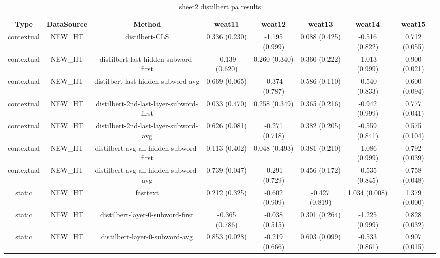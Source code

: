 \begin{sidewaystable}[htb]
    \centering
    \caption{sheet2 distilbert pa results}
    \label{appendix_tab:sheet2_distilbert_pa_results}
    \small
    \begin{tabular}{@{}cccccccc@{}}
        \toprule
        Type & DataSource & Method & weat11 & weat12 & weat13 & weat14 & weat15 \\
        \midrule
        contextual & NEW\_HT & distilbert-CLS & 0.336 (0.230) & -1.195 (0.999) & 0.088 (0.425) & -0.516 (0.822) & 0.712 (0.055) \\
        contextual & NEW\_HT & distilbert-last-hidden-subword-first & -0.139 (0.620) & 0.260 (0.340) & 0.360 (0.222) & -1.013 (0.999) & 0.900 (0.021) \\
        contextual & NEW\_HT & distilbert-last-hidden-subword-avg & 0.669 (0.065) & -0.374 (0.787) & 0.586 (0.110) & -0.540 (0.833) & 0.600 (0.094) \\
        contextual & NEW\_HT & distilbert-2nd-last-layer-subword-first & 0.033 (0.470) & 0.258 (0.349) & 0.365 (0.216) & -0.942 (0.999) & 0.777 (0.041) \\
        contextual & NEW\_HT & distilbert-2nd-last-layer-subword-avg & 0.626 (0.081) & -0.271 (0.718) & 0.382 (0.205) & -0.559 (0.841) & 0.575 (0.104) \\
        contextual & NEW\_HT & distilbert-avg-all-hidden-subword-first & 0.113 (0.402) & 0.048 (0.493) & 0.381 (0.210) & -1.086 (0.999) & 0.792 (0.039) \\
        contextual & NEW\_HT & distilbert-avg-all-hidden-subword-avg & 0.739 (0.047) & -0.291 (0.729) & 0.456 (0.172) & -0.535 (0.845) & 0.758 (0.048) \\
        static & NEW\_HT & fasttext & 0.212 (0.325) & -0.602 (0.909) & -0.427 (0.819) & 1.034 (0.008) & 1.379 (0.000) \\
        static & NEW\_HT & distilbert-layer-0-subword-first & -0.365 (0.786) & -0.038 (0.515) & 0.301 (0.264) & -1.225 (0.999) & 0.828 (0.032) \\
        static & NEW\_HT & distilbert-layer-0-subword-avg & 0.853 (0.028) & -0.219 (0.666) & 0.603 (0.099) & -0.533 (0.861) & 0.907 (0.015) \\
        \bottomrule
    \end{tabular}
\end{sidewaystable}